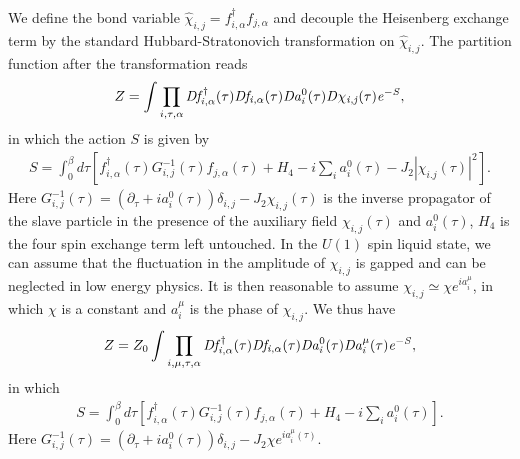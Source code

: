 \documentclass[12pt]{article}
\begin{document}
 We define the bond variable $\hat{\chi}_{i,j}=f^{\dagger}_{i,\alpha} f_{j,\alpha}$ and decouple the Heisenberg exchange term by the standard Hubbard-Stratonovich transformation on $\hat{\chi}_{i,j}$. The partition function after the transformation reads
 \begin{eqnarray}
 Z= \int \prod_{i,\tau,\alpha} \it{D}f^{\dagger}_{i,\alpha}(\tau)\it{D}f_{i,\alpha}(\tau)\it{D}a^{\mathrm{0}}_{i}(\tau)\it{D}\chi_{i,j}(\tau)e^{-S},\nonumber
 \end{eqnarray}
 in which the action $S$ is given by
 \begin{eqnarray}
S=\int_{0}^{\beta} d\tau   [f^{\dagger}_{i,\alpha}(\tau)G^{-1}_{i,j}(\tau) f_{j,\alpha}(\tau)+H_{4}-i\sum_{i}a^{0}_{i}(\tau)-J_{2}|\chi_{i.j}(\tau)|^{2}]. \nonumber
 \end{eqnarray}  
 Here $G^{-1}_{i,j}(\tau)=(\partial_{\tau}+ia^{0}_{i}(\tau))\delta_{i,j}-J_{2}\chi_{i,j}(\tau)$ is the inverse propagator of the slave particle in the presence of the auxiliary field $\chi_{i,j}(\tau)$ and $a^{0}_{i}(\tau)$, $H_{4}$ is the four spin exchange term left untouched. In the $U(1)$ spin liquid state, we can assume that the fluctuation in the amplitude of $\chi_{i,j}$ is gapped and can be neglected in low energy physics. It is then reasonable to assume $\chi_{i,j}\simeq \chi e^{ia^{\mu}_{i}}$, in which $\chi$ is a constant and $a^{\mu}_{i}$ is the phase of $\chi_{i,j}$. We thus have
 \begin{eqnarray}
 Z= Z_{0} \int \prod_{i,\mu,\tau,\alpha} \it{D}f^{\dagger}_{i,\alpha}(\tau)\it{D}f_{i,\alpha}(\tau)\it{D}a^{\mathrm{0}}_{i}(\tau) \it{D}a^{\mu}_{i}(\tau) e^{-S},\nonumber
 \end{eqnarray}
 in which
 \begin{eqnarray}
S=\int_{0}^{\beta} d\tau   [f^{\dagger}_{i,\alpha}(\tau)G^{-1}_{i,j}(\tau) f_{j,\alpha}(\tau)+H_{4}-i\sum_{i}a^{\mathrm{0}}_{i}(\tau)] \nonumber.
 \end{eqnarray} 
Here $G^{-1}_{i,j}(\tau)=(\partial_{\tau}+ia^{0}_{i}(\tau))\delta_{i,j}-J_{2}\chi e^{ia^{\mu}_{i}(\tau)}$.
\end{document}
